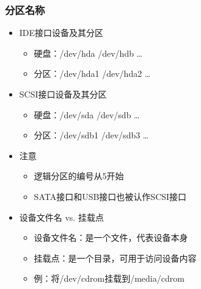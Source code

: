 \documentclass[xcolor=svgnames,bigger,presentation]{beamer}
\begin{document}
\begin{frame}
\frametitle{分区名称}
\label{sec-3-2-4}
\begin{itemize}

\item IDE接口设备及其分区
\label{sec-3-2-4-1}%
\begin{itemize}

\item 硬盘：/dev/hda /dev/hdb \ldots{}
\label{sec-3-2-4-1-1}%

\item 分区：/dev/hda1 /dev/hda2 \ldots{}
\label{sec-3-2-4-1-2}%
\end{itemize} %

\item SCSI接口设备及其分区
\label{sec-3-2-4-2}%
\begin{itemize}

\item 硬盘：/dev/sda /dev/sdb \ldots{}
\label{sec-3-2-4-2-1}%

\item 分区：/dev/sdb1 /dev/sdb3 \ldots{}
\label{sec-3-2-4-2-2}%
\end{itemize} %

\item 注意
\label{sec-3-2-4-3}%
\begin{itemize}

\item 逻辑分区的编号从5开始
\label{sec-3-2-4-3-1}%

\item SATA接口和USB接口也被认作SCSI接口
\label{sec-3-2-4-3-2}%
\end{itemize} %

\item 设备文件名 vs. 挂载点
\label{sec-3-2-4-4}%
\begin{itemize}

\item 设备文件名：是一个文件，代表设备本身
\label{sec-3-2-4-4-1}%

\item 挂载点：是一个目录，可用于访问设备内容
\label{sec-3-2-4-4-2}%

\item 例：将/dev/cdrom挂载到/media/cdrom
\label{sec-3-2-4-4-3}%
\end{itemize} %
\end{itemize} %
\end{frame}
\end{document}
